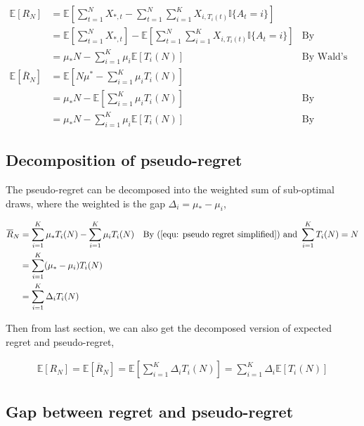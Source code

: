 \documentclass{article}
\begin{document}
\begin{align}
    \mathbb{E}[R_N] &= \mathbb{E}\left[\sum_{t=1}^{N} X_{\ast, t}-\sum_{t=1}^{N} \sum_{i = 1}^{K} X_{i, T_i(t)} \mathbb{I}\{A_t = i\}\right]\\
    &= \mathbb{E}\left[\sum_{t=1}^{N} X_{\ast, t}\right]- \mathbb{E}\left[\sum_{t=1}^{N} \sum_{i = 1}^{K} X_{i, T_i(t)} \mathbb{I}\{A_t = i\}\right] & \text{By expectation linearity}\\
    &= \mu_\ast N - \sum_{i = 1}^{K} \mu_i \mathbb{E}[T_i(N)] 
    & \text{By Wald's Theorem}\\
    \mathbb{E}[\overline{R}_N] &= \mathbb{E}\left[N \mu^{*}-\sum_{i = 1}^{K} \mu_i T_i(N)\right]\\
    &= \mu_\ast N - \mathbb{E}\left[\sum_{i = 1}^{K} \mu_i T_i(N)\right] & \text{By expectation linearity}\\
    &= \mu_\ast N - \sum_{i = 1}^{K} \mu_i \mathbb{E}\left[T_i(N)\right] & \text{By expectation linearity}
\end{align}

\subsection{Decomposition of pseudo-regret}

The pseudo-regret can be decomposed into the weighted sum of sub-optimal draws, where the weighted is the gap $\Delta_i = \mu_\ast - \mu_i$, 

\begin{align}
    \overline{R}_N &= \sum_{i=1}^K \mu_\ast T_i(N) - \sum_{i = 1}^{K} \mu_i T_i(N) & \text{By } (\ref{equ: pseudo regret simplified}) \text{ and } \sum_{i = 1}^K T_i(N) = N\\
    &= \sum_{i=1}^K (\mu_\ast - \mu_i) T_i(N)\\
    &= \sum_{i=1}^K \Delta_i T_i(N)
\end{align}

Then from last section, we can also get the decomposed version of expected regret and pseudo-regret, 

\begin{align}
\mathbb{E}[R_N] = \mathbb{E}[\overline{R}_N] = \mathbb{E}\left[\sum_{i=1}^K \Delta_i T_i(N)\right] = \sum_{i=1}^K \Delta_i \mathbb{E}[T_i(N)]
\end{align}


\subsection{Gap between regret and pseudo-regret}
\end{document}
